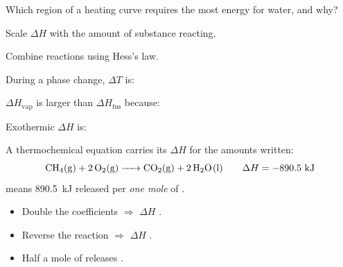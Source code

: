 \documentclass{apchem-notes}
\begin{document}
\begin{exitticket}
Which region of a heating curve requires the most energy for water, and
why?
\end{exitticket}


\begin{objectives}
  \item Scale $\Delta H$ with the amount of substance reacting.
  \item Combine reactions using Hess's law.
\end{objectives}


\begin{warmup}[3]
  \item During a phase change, $\Delta T$ is:
  \item $\Delta H_{\text{vap}}$ is larger than
        $\Delta H_{\text{fus}}$ because:
  \item Exothermic $\Delta H$ is: 
\end{warmup}



A thermochemical equation carries its $\Delta H$ for the amounts written:
\[ \ce{CH4(g) + 2O2(g) -> CO2(g) + 2H2O(l)} \qquad
   \Delta H = -890.5~\text{kJ} \]
means \SI{890.5}{\kilo\joule} released per \emph{one mole} of .

\begin{itemize}[leftmargin=*,itemsep=0.3em]
  \item Double the coefficients $\Rightarrow$ $\Delta H$
        .
  \item Reverse the reaction $\Rightarrow$ $\Delta H$
        .
  \item Half a mole of  releases
        .
\end{itemize}
\end{document}
